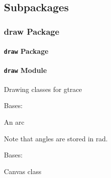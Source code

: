 \documentclass[letterpaper,10pt,english]{sphinxmanual}
\begin{document}
\subsection{Subpackages}
\label{api/gtrace:subpackages}

\subsubsection{draw Package}
\label{api/gtrace.draw::doc}\label{api/gtrace.draw:draw-package}

\paragraph{\texttt{draw} Package}
\label{api/gtrace.draw:id1}\label{api/gtrace.draw:module-gtrace.draw}

\paragraph{\texttt{draw} Module}
\label{api/gtrace.draw:module-gtrace.draw.draw}\label{api/gtrace.draw:draw-module}
Drawing classes for gtrace

\begin{fulllineitems}
\label{api/gtrace.draw:gtrace.draw.draw.Arc}
Bases: {\hyperref[api/gtrace.draw:gtrace.draw.draw.Shape]{}}

An arc

Note that angles are stored in rad.

\end{fulllineitems}


\begin{fulllineitems}
\label{api/gtrace.draw:gtrace.draw.draw.Canvas}
Bases: 

Canvas class

\begin{fulllineitems}
\label{api/gtrace.draw:gtrace.draw.draw.Canvas.add_layer}
\end{fulllineitems}


\begin{fulllineitems}
\label{api/gtrace.draw:gtrace.draw.draw.Canvas.add_shape}
\end{fulllineitems}


\end{fulllineitems}
\end{document}
